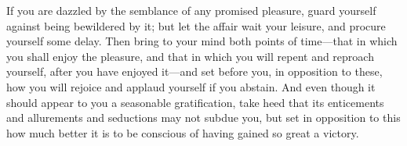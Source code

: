 If you are dazzled by the semblance of any promised pleasure, guard
yourself against being bewildered by it; but let the affair wait your
leisure, and procure yourself some delay. Then bring to your mind both
points of time---that in which you shall enjoy the pleasure, and that in
which you will repent and reproach yourself, after you have enjoyed
it---and set before you, in opposition to these, how you will rejoice and
applaud yourself if you abstain. And even though it should appear to you
a seasonable gratification, take heed that its enticements and
allurements and seductions may not subdue you, but set in opposition to
this how much better it is to be conscious of having gained so great a
victory.
